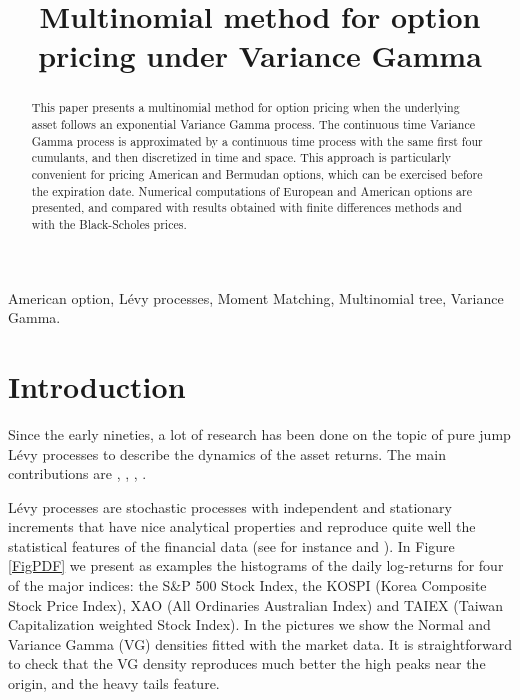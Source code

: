 \documentclass[]{interact}
\theoremstyle{plain}%
\theoremstyle{definition}
\theoremstyle{remark}
\begin{document}
\title{Multinomial method for option pricing under Variance Gamma}

\author{
 }

\maketitle

\begin{abstract}
This paper presents a multinomial method for option pricing
when the underlying asset follows an exponential Variance Gamma process.
The continuous time Variance Gamma process is approximated by a continuous time process with the same first four cumulants, and then discretized in time and space. 
This approach is particularly convenient for pricing American and Bermudan options, 
which can be exercised before the expiration date.
Numerical computations of European and American options are presented, and compared with results obtained with finite differences methods and with the Black-Scholes
prices. 
\end{abstract}

\begin{keywords}
American option, Lévy processes, Moment Matching, Multinomial tree, Variance Gamma.
\end{keywords}





\section{Introduction}
 
Since the early nineties, a lot of research has been done on the topic of pure jump Lévy processes 
to describe the dynamics of the asset returns. The main contributions are
\cite{BN98}, \cite{EbKe95}, \cite{GeMaYo98}, \cite{MaSe90}.

Lévy processes are stochastic processes with independent and stationary
increments that have nice analytical properties and 
reproduce quite well the statistical features of the financial data (see for instance \cite{Ait12} and \cite{Cont}).
In Figure \ref{FigPDF} we present as examples the histograms of the
daily log-returns for four of the major indices:  
the S\&P 500 Stock Index, 
the KOSPI (Korea Composite Stock Price Index), 
XAO (All Ordinaries Australian Index)  
and TAIEX (Taiwan Capitalization weighted Stock Index).
In the pictures we show the Normal and Variance Gamma (VG) densities fitted with the market data. 
It is straightforward to check that the 
VG density reproduces much better the high peaks near the origin, and the heavy tails feature.
\end{document}
